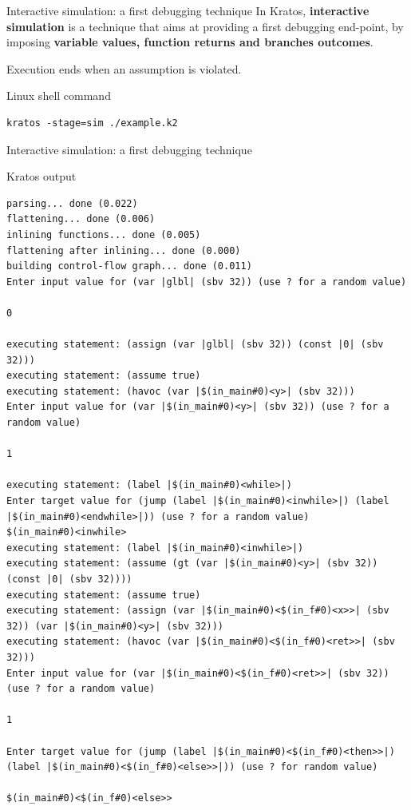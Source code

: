 \documentclass[aspectratio=1610,10.5pt]{beamer} %
\begin{document}
\begin{frame}[fragile]{Interactive simulation: a first debugging technique}
    In Kratos, \textbf{interactive simulation} is a technique that aims at providing a first debugging end-point, by imposing \textbf{variable values, function returns and branches outcomes}.

    \smallskip

    Execution ends when an assumption is violated.

    \begin{block}{Linux shell command}
            \begin{verbatim}
kratos -stage=sim ./example.k2
            \end{verbatim}
    \end{block}
\end{frame}

\begin{frame}[fragile]{Interactive simulation: a first debugging technique}
    \begin{block}{Kratos output}
            \begin{verbatim}
parsing... done (0.022)
flattening... done (0.006)
inlining functions... done (0.005)
flattening after inlining... done (0.000)
building control-flow graph... done (0.011)
Enter input value for (var |glbl| (sbv 32)) (use ? for a random value)

0

executing statement: (assign (var |glbl| (sbv 32)) (const |0| (sbv 32)))
executing statement: (assume true)
executing statement: (havoc (var |$(in_main#0)<y>| (sbv 32)))
Enter input value for (var |$(in_main#0)<y>| (sbv 32)) (use ? for a random value)

1

executing statement: (label |$(in_main#0)<while>|)
Enter target value for (jump (label |$(in_main#0)<inwhile>|) (label |$(in_main#0)<endwhile>|)) (use ? for a random value)
$(in_main#0)<inwhile>
executing statement: (label |$(in_main#0)<inwhile>|)
executing statement: (assume (gt (var |$(in_main#0)<y>| (sbv 32)) (const |0| (sbv 32))))
executing statement: (assume true)
executing statement: (assign (var |$(in_main#0)<$(in_f#0)<x>>| (sbv 32)) (var |$(in_main#0)<y>| (sbv 32)))
executing statement: (havoc (var |$(in_main#0)<$(in_f#0)<ret>>| (sbv 32)))
Enter input value for (var |$(in_main#0)<$(in_f#0)<ret>>| (sbv 32)) (use ? for a random value)

1

Enter target value for (jump (label |$(in_main#0)<$(in_f#0)<then>>|) (label |$(in_main#0)<$(in_f#0)<else>>|)) (use ? for random value)

$(in_main#0)<$(in_f#0)<else>>
            \end{verbatim}
    \end{block}
\end{frame}
\end{document}

